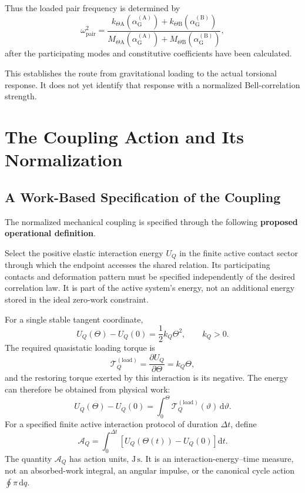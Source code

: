 Thus the loaded pair frequency is determined by
\begin{equation}
    \omega_{\mathrm{pair}}^2
    =\frac{
        k_{\Theta\mathrm A}(\alpha_{\mathrm G}^{(\mathrm A)})
        +k_{\Theta\mathrm B}(\alpha_{\mathrm G}^{(\mathrm B)})
    }{
        M_{\Theta\mathrm A}(\alpha_{\mathrm G}^{(\mathrm A)})
        +M_{\Theta\mathrm B}(\alpha_{\mathrm G}^{(\mathrm B)})
    },
\end{equation}
after the participating modes and constitutive coefficients have been calculated.

This establishes the route from gravitational loading to the actual torsional response. It does not yet identify that response with a normalized Bell-correlation strength.

\section{The Coupling Action and Its Normalization}

\subsection{A Work-Based Specification of the Coupling}

The normalized mechanical coupling is specified through the following \textbf{proposed operational definition}.

Select the positive elastic interaction energy $U_Q$ in the finite active contact sector through which the endpoint accesses the shared relation. Its participating contacts and deformation pattern must be specified independently of the desired correlation law. It is part of the active system's energy, not an additional energy stored in the ideal zero-work constraint.

For a single stable tangent coordinate,
\begin{equation}
    U_Q(\Theta)-U_Q(0)
    =\frac12k_Q\Theta^2,
    \qquad k_Q>0.
\end{equation}
The required quasistatic loading torque is
\begin{equation}
    \mathcal T_Q^{(\mathrm{load})}
    =\frac{\partial U_Q}{\partial\Theta}
    =k_Q\Theta,
\end{equation}
and the restoring torque exerted by this interaction is its negative. The energy can therefore be obtained from physical work:
\begin{equation}
    U_Q(\Theta)-U_Q(0)
    =\int_0^\Theta
    \mathcal T_Q^{(\mathrm{load})}(\vartheta)\,\mathrm d\vartheta.
\end{equation}
For a specified finite active interaction protocol of duration $\Delta t$, define
\begin{equation}
    \boxed{
    \mathcal A_Q
    =\int_0^{\Delta t}
    \left[U_Q(\Theta(t))-U_Q(0)\right]\mathrm dt
    }.
\end{equation}
The quantity $\mathcal A_Q$ has action units, $\mathrm{J\,s}$. It is an interaction-energy--time measure, not an absorbed-work integral, an angular impulse, or the canonical cycle action $\oint\pi\,\mathrm dq$.

